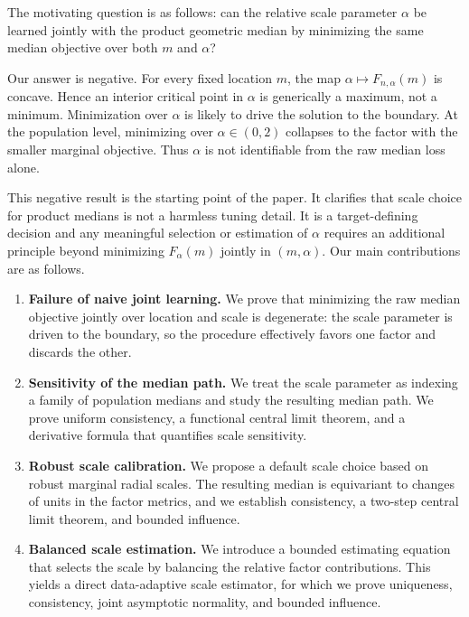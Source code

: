 \documentclass[11pt]{article}
\newcommand{\1}{\mathbf{1}}
\begin{document}
The motivating question is as follows: can the relative scale parameter $\alpha$ be learned jointly with the product geometric median by minimizing the same median objective over both $m$ and $\alpha$? 

Our answer is negative. For every fixed location $m$, the map
$
 \alpha\mapsto F_{n,\alpha}(m)
$
is concave.  Hence an interior critical point in $\alpha$ is generically a maximum, not a minimum.  Minimization over $\alpha$ is likely to drive the solution to the boundary.  At the population level, minimizing over $\alpha\in(0,2)$  collapses to the factor with the smaller marginal objective. Thus $\alpha$ is not identifiable from the raw median loss alone.

This negative result is the starting point of the paper.  It clarifies that scale choice for product medians is not a harmless tuning detail.  It is a target-defining decision and any meaningful selection or estimation of $\alpha$ requires an additional principle beyond minimizing $F_\alpha(m)$ jointly in $(m,\alpha)$. Our main contributions are as follows.

\begin{enumerate}
\item \textbf{Failure of naive joint learning.}
We prove that minimizing the raw median objective jointly over location and
scale is degenerate: the scale parameter is driven to the boundary, so the
procedure effectively favors one factor and discards the other.

\item \textbf{Sensitivity of the median path.}
We treat the scale parameter as indexing a family of population medians and
study the resulting median path.  We prove uniform consistency, a functional
central limit theorem, and a derivative formula that quantifies scale
sensitivity.

\item \textbf{Robust scale calibration.}
We propose a default scale choice based on robust marginal radial scales.  The
resulting median is equivariant to changes of units in the factor metrics, and
we establish consistency, a two-step central limit theorem, and bounded
influence.

\item \textbf{Balanced scale estimation.}
We introduce a bounded estimating equation that selects the scale by balancing
the relative factor contributions.  This yields a direct data-adaptive scale
estimator, for which we prove uniqueness, consistency, joint asymptotic
normality, and bounded influence.
\end{enumerate}
\end{document}
